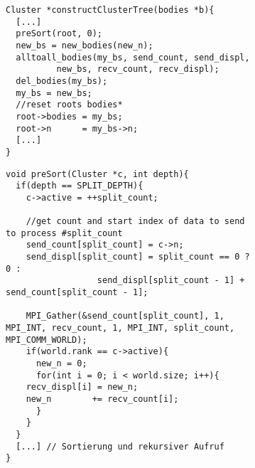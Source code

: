 \begin{figure}[t]
  \begin{subfigure}{0.9\textwidth}
    \begin{lstlisting}[label=lst:parconsttree, caption={Ausschnitt aus der parallelen Konstruktion des Clusterbaumes.}]
Cluster *constructClusterTree(bodies *b){
  [...]
  preSort(root, 0);
  new_bs = new_bodies(new_n);
  alltoall_bodies(my_bs, send_count, send_displ, 
		  new_bs, recv_count, recv_displ);
  del_bodies(my_bs);
  my_bs = new_bs;
  //reset roots bodies*
  root->bodies = my_bs;
  root->n      = my_bs->n;
  [...]
}
    \end{lstlisting}
  \end{subfigure}
\end{figure}

\begin{figure}[t]
  \begin{subfigure}{0.9\textwidth}
    \begin{lstlisting}[label=lst:presort, caption={Diese Methode sortiert die lokalen \code{bodies} nach Prozesszugehörigkeit.}]
void preSort(Cluster *c, int depth){
  if(depth == SPLIT_DEPTH){
    c->active = ++split_count;
    
    //get count and start index of data to send to process #split_count
    send_count[split_count] = c->n;
    send_displ[split_count] = split_count == 0 ? 0 : 
			      send_displ[split_count - 1] + send_count[split_count - 1];
    
    MPI_Gather(&send_count[split_count], 1, MPI_INT, recv_count, 1, MPI_INT, split_count, MPI_COMM_WORLD);
    if(world.rank == c->active){
      new_n = 0;
      for(int i = 0; i < world.size; i++){
	recv_displ[i] = new_n;
	new_n        += recv_count[i];
      }
    }
  } 
  [...] // Sortierung und rekursiver Aufruf
}
    \end{lstlisting}
  \end{subfigure}
\end{figure}
